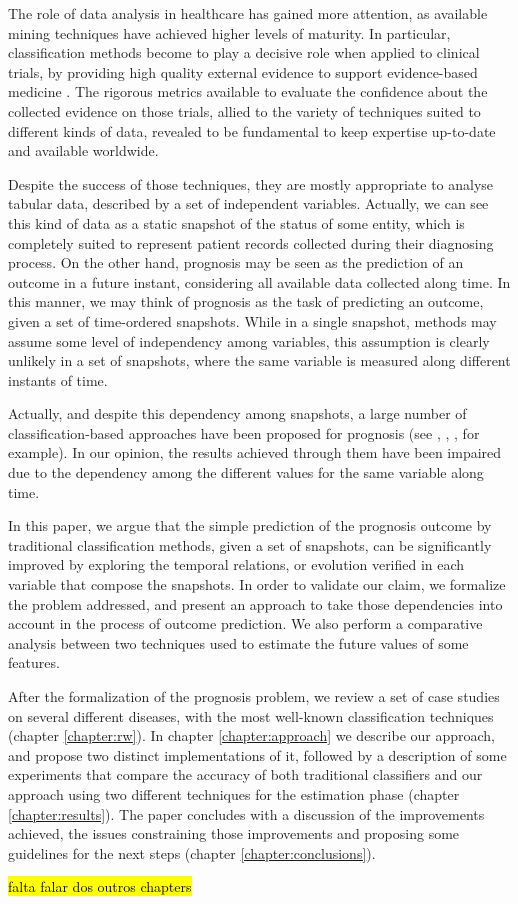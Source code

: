 The role of data analysis in healthcare has gained more attention, as available mining techniques have achieved higher levels of maturity.
 In particular, classification methods become to play a decisive role when applied to clinical trials, by providing high quality external 
 evidence to support evidence-based medicine \cite{Sackett1996}. The rigorous metrics available to evaluate the confidence about the collected evidence 
 on those trials, allied to the variety of techniques suited to different kinds of data, revealed to be fundamental to keep expertise 
 up-to-date and available worldwide.

Despite the success of those techniques, they are mostly appropriate to analyse tabular data, described by a set of independent variables.
 Actually, we can see this kind of data as a static snapshot of the status of some entity, which is completely suited to represent patient
 records collected during their diagnosing process. On the other hand, prognosis may be seen as the prediction of an outcome in a future 
 instant, considering all available data collected along time. In this manner, we may think of prognosis as the task of predicting an
 outcome, given a set of time-ordered snapshots. While in a single snapshot, methods may assume some level of independency among
 variables, this assumption is clearly unlikely in a set of snapshots, where the same variable is measured along different instants of time. 

Actually, and despite this dependency among snapshots, a large number of classification-based approaches have been proposed for prognosis
 (see \cite{Endo2008}, \cite{Paradise2009}, \cite{Zhou2011}, for example). In our opinion, the results achieved through them have been
 impaired due to the dependency among the  different values for the same variable along time. 

In this paper, we argue that the simple prediction of the prognosis outcome by traditional classification methods, given a set of
 snapshots, can be significantly improved by exploring the temporal relations, or evolution verified in each variable that compose 
 the snapshots. In order to validate our claim, we formalize the problem addressed, and present an approach to take those dependencies
 into account in the process of outcome prediction. We also perform a comparative analysis between two techniques used to estimate 
 the future values of some features.

After the formalization of the prognosis problem, we review a set of case studies on several different diseases, with the most 
well-known classification techniques (chapter \ref{chapter:rw}). In chapter \ref{chapter:approach} we describe our approach, and propose two distinct implementations
 of it, followed by a description of some experiments that compare the accuracy of both traditional classifiers and our approach 
 using two different techniques for the estimation phase (chapter \ref{chapter:results}). The paper concludes with a discussion of the improvements 
 achieved, the issues constraining those improvements and proposing some guidelines for the next steps (chapter \ref{chapter:conclusions}).

 \hl{falta falar dos outros chapters}

\cleardoublepage